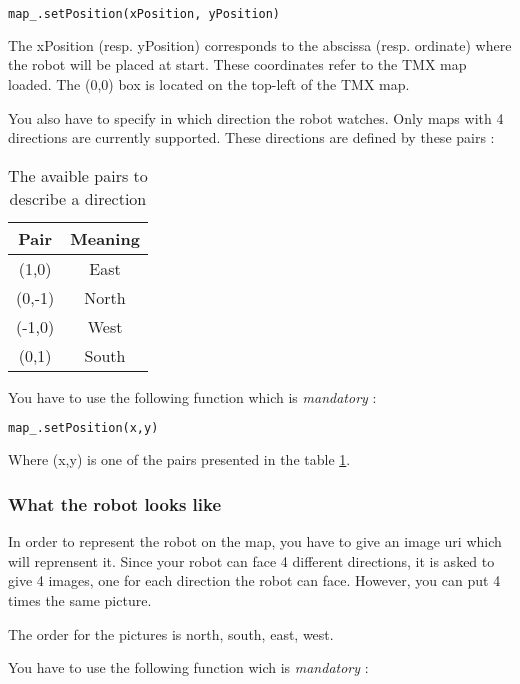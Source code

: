 \documentclass[a4paper,11pt]{article}
\begin{document}
\begin{lstlisting}[language=Python]
map_.setPosition(xPosition, yPosition)
\end{lstlisting}

The xPosition (resp. yPosition) corresponds to the abscissa
(resp. ordinate) where the robot will be placed at start. These
coordinates refer to the TMX map loaded. The (0,0) box is located on
the top-left of the TMX map.

You also have to specify in which direction the robot watches. Only
maps with 4 directions are currently supported. These directions are
defined by these pairs :


\begin{table}[h]
  \begin{center}
    \begin{tabular}{|c|c|}
      \hline
      Pair   & Meaning \\
      \hline
      (1,0)  & East    \\
      (0,-1) & North   \\
      (-1,0) & West    \\
      (0,1)  & South   \\
      \hline
    \end{tabular} 
    \caption{\label{tab:Pypairs} The avaible pairs to describe a
      direction}
  \end{center}
\end{table}


You have to use the following function which is \emph{mandatory} :

\begin{lstlisting}[language=Python]
map_.setPosition(x,y)
\end{lstlisting}

Where (x,y) is one of the pairs presented in the table \ref{tab:Pypairs}.

\subsubsection{What the robot looks like}

In order to represent the robot on the map, you have to give an image
uri which will reprensent it. Since your robot can face 4 different
directions, it is asked to give 4 images, one for each direction the
robot can face. However, you can put 4 times the same picture.

The order for the pictures is north, south, east, west.

You have to use the following function wich is \emph{mandatory} :
\end{document}
